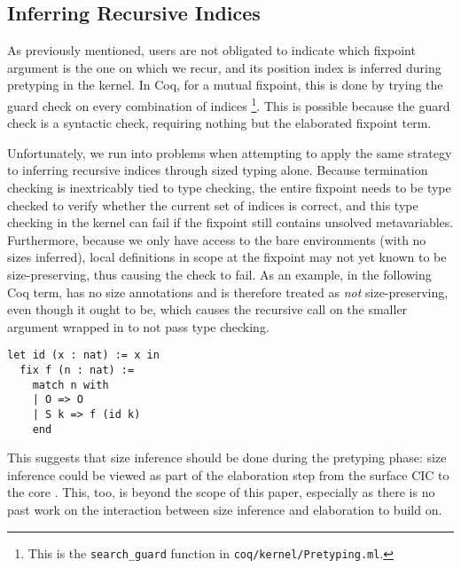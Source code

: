 \subsection{Inferring Recursive Indices}\label{sec:impl:recind}

As previously mentioned, users are not obligated to indicate which fixpoint argument is the one on which we recur,
and its position index is inferred during pretyping in the kernel.
In Coq, for a mutual fixpoint, this is done by trying the guard check on every combination of indices%
\footnote{This is the \texttt{search\_guard} function in \texttt{coq/kernel/Pretyping.ml}.}.
This is possible because the guard check is a syntactic check, requiring nothing but the elaborated fixpoint term.

Unfortunately, we run into problems when attempting to apply the same strategy to inferring recursive indices through sized typing alone.
Because termination checking is inextricably tied to type checking,
the entire fixpoint needs to be type checked to verify whether the current set of indices is correct,
and this type checking in the kernel can fail if the fixpoint still contains unsolved metavariables.
Furthermore, because we only have access to the bare environments (\ie with no sizes inferred),
local definitions in scope at the fixpoint may not yet known to be size-preserving,
thus causing the check to fail.
As an example, in the following Coq term,  has no size annotations and is therefore treated as \emph{not} size-preserving,
even though it ought to be, which causes the recursive call on the smaller argument wrapped in  to not pass type checking.

\begin{verbatim}
let id (x : nat) := x in
  fix f (n : nat) :=
    match n with
    | O => O
    | S k => f (id k)
    end
\end{verbatim}

This suggests that size inference should be done during the pretyping phase:
size inference could be viewed as part of the elaboration step from the surface CIC to the core \lang.
This, too, is beyond the scope of this paper, especially as there is no past work on the interaction between size inference and elaboration to build on.
